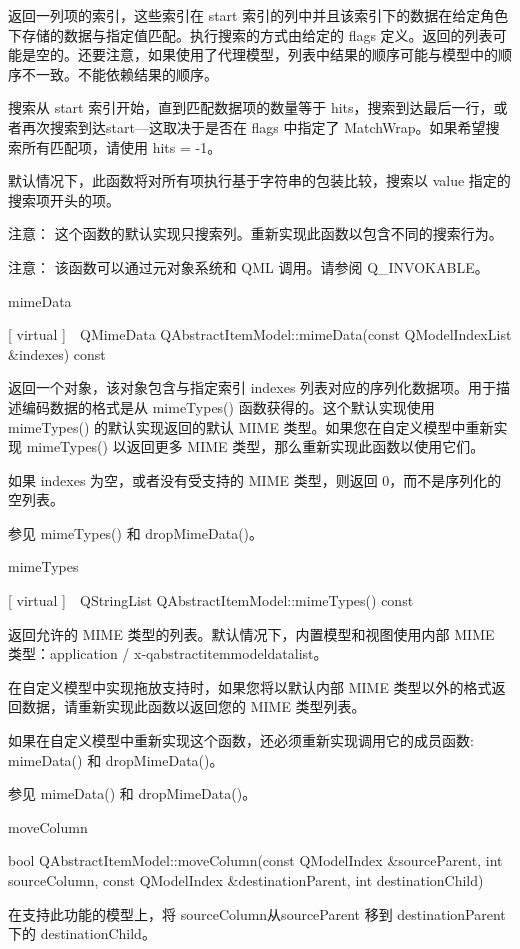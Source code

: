 返回一列项的索引，这些索引在 start 索引的列中并且该索引下的数据在给定角色下存储的数据与指定值匹配。执行搜索的方式由给定的 flags 定义。返回的列表可能是空的。还要注意，如果使用了代理模型，列表中结果的顺序可能与模型中的顺序不一致。不能依赖结果的顺序。

搜索从 start 索引开始，直到匹配数据项的数量等于 hits，搜索到达最后一行，或者再次搜索到达start—这取决于是否在 flags 中指定了 MatchWrap。如果希望搜索所有匹配项，请使用 hits = -1。

默认情况下，此函数将对所有项执行基于字符串的包装比较，搜索以 value 指定的搜索项开头的项。

注意： 这个函数的默认实现只搜索列。重新实现此函数以包含不同的搜索行为。

注意： 该函数可以通过元对象系统和 QML 调用。请参阅 Q\_INVOKABLE。

mimeData

[ virtual ] QMimeData QAbstractItemModel::mimeData(const QModelIndexList \&indexes) const

返回一个对象，该对象包含与指定索引 indexes 列表对应的序列化数据项。用于描述编码数据的格式是从 mimeTypes() 函数获得的。这个默认实现使用 mimeTypes() 的默认实现返回的默认 MIME 类型。如果您在自定义模型中重新实现 mimeTypes() 以返回更多 MIME 类型，那么重新实现此函数以使用它们。

如果 indexes 为空，或者没有受支持的 MIME 类型，则返回 0，而不是序列化的空列表。

参见 mimeTypes() 和 dropMimeData()。

mimeTypes

[ virtual ] QStringList QAbstractItemModel::mimeTypes() const

返回允许的 MIME 类型的列表。默认情况下，内置模型和视图使用内部 MIME 类型：application / x-qabstractitemmodeldatalist。

在自定义模型中实现拖放支持时，如果您将以默认内部 MIME 类型以外的格式返回数据，请重新实现此函数以返回您的 MIME 类型列表。

如果在自定义模型中重新实现这个函数，还必须重新实现调用它的成员函数: mimeData() 和 dropMimeData()。

参见 mimeData() 和 dropMimeData()。

moveColumn

bool QAbstractItemModel::moveColumn(const QModelIndex \&sourceParent, int sourceColumn, const QModelIndex \&destinationParent, int destinationChild)

在支持此功能的模型上，将 sourceColumn从sourceParent 移到 destinationParent 下的 destinationChild。

